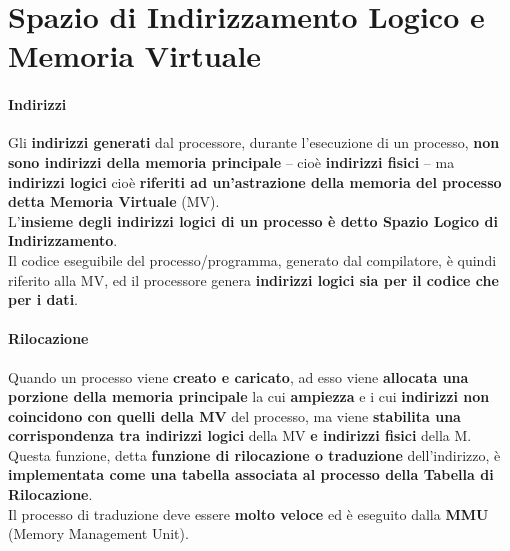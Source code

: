 \documentclass[10pt]{report}
\begin{document}
\section{Spazio di Indirizzamento Logico e Memoria Virtuale}
\paragraph{Indirizzi} Gli \textbf{indirizzi generati} dal processore, durante l'esecuzione di un processo, \textbf{non sono indirizzi della memoria principale} -- cioè \textbf{indirizzi fisici} -- ma \textbf{indirizzi logici} cioè \textbf{riferiti ad un'astrazione della memoria del processo detta Memoria Virtuale} (MV).\\
L'\textbf{insieme degli indirizzi logici di un processo è detto Spazio Logico di Indirizzamento}.\\
Il codice eseguibile del processo/programma, generato dal compilatore, è quindi riferito alla MV, ed il processore genera \textbf{indirizzi logici sia per il codice che per i dati}.
\paragraph{Rilocazione} Quando un processo viene \textbf{creato e caricato}, ad esso viene \textbf{allocata una porzione della memoria principale} la cui \textbf{ampiezza} e i cui \textbf{indirizzi non coincidono con quelli della MV} del processo, ma viene \textbf{stabilita una corrispondenza tra indirizzi logici} della MV \textbf{e indirizzi fisici} della M. Questa funzione, detta \textbf{funzione di rilocazione o traduzione} dell'indirizzo, è \textbf{implementata come una tabella associata al processo della Tabella di Rilocazione}.\\
Il processo di traduzione deve essere \textbf{molto veloce} ed è eseguito dalla \textbf{MMU} (Memory Management Unit).
\end{document}

